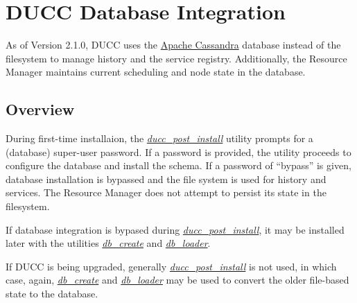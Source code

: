 % 
% 
% 
% 
\section{DUCC Database Integration}
\label{sec:ducc.database}

    As of Version 2.1.0, DUCC uses the \href{https://cassandra.apache.org/}{Apache Cassandra}
    database instead of the filesystem to manage
    history and the service registry.  Additionally, the Resource Manager maintains
    current scheduling and node state in the database.

   \subsection{Overview}

    During first-time installaion, the \hyperref[subsec:install.single-user]{\em ducc\_post\_install} utility
    prompts for a (database) super-user password.  If a password is provided, the utility 
    proceeds to configure the database and install the schema.  If a password
    of ``bypass'' is given, database installation is bypassed and the file system
    is used for history and services.  The Resource Manager does not attempt to
    persist its state in the filesystem.
    
    If database integration is bypased during \hyperref[subsec:install.single-user]{\em ducc\_post\_install}, it may be
    installed later with the utilities \hyperref[subsec:cli.db.create]{\em db\_create} and \hyperref[subsec:cli.db.loader]{\em db\_loader}.

    If DUCC is being upgraded, generally \hyperref[subsec:install.single-user]{\em ducc\_post\_install} is not used, in 
    which case, again, \hyperref[subsec:cli.db.create]{\em db\_create} and \hyperref[subsec:cli.db.loader]{\em db\_loader} may be used to
    convert the older file-based state to the database.

